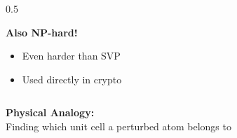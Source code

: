 \documentclass[aspectratio=169,10pt]{beamer}
\newcommand{\teaching}[1]{}
\theoremstyle{plain}
\begin{document}
\begin{frame}
\begin{columns}[T]
\begin{column}{0.5\textwidth}
    \vspace{0.3cm}
    
    \textbf{Also NP-hard!}
    \begin{itemize}
      \item Even harder than SVP
      \item Used directly in crypto
    \end{itemize}
  
    \end{column}
  \end{columns}
  
  \vspace{0.3cm}
  
  \begin{greenBox}
    \textbf{Physical Analogy:}\\
    Finding which unit cell a perturbed atom belongs to
  \end{greenBox}
  
  \teaching{Connect to error correction}
\end{frame}
\end{document}
